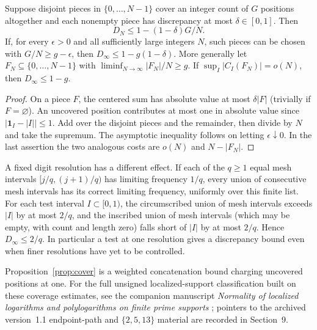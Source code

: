 \documentclass[11pt]{article}
\begin{document}
\begin{proposition}\label{prop:cover}
Suppose disjoint pieces in \(\{0,\ldots,N-1\}\) cover an integer count of \(G\) positions altogether and each nonempty piece has discrepancy at most \(\delta\in[0,1]\). Then
\begin{equation}\label{eq:covered}
 D_N\le 1-(1-\delta)G/N .
\end{equation}
If, for every \(\epsilon>0\) and all sufficiently large integers \(N\), such pieces can be chosen with \(G/N\ge g-\epsilon\), then \(D_\infty\le1-g(1-\delta)\). More generally let \(F_N\subseteq\{0,\ldots,N-1\}\) with \(\liminf_{N\to\infty} |F_N|/N\ge g\). If \(\sup_I|C_I(F_N)|=o(N)\), then \(D_\infty\le1-g\).
\end{proposition}
\begin{proof}
On a piece \(F\), the centered sum has absolute value at most \(\delta |F|\) (trivially if \(F=\varnothing\)). An uncovered position contributes at most one in absolute value since \(|\mathbf1_I-|I||\le1\). Add over the disjoint pieces and the remainder, then divide by \(N\) and take the supremum. The asymptotic inequality follows on letting \(\epsilon\downarrow0\). In the last assertion the two analogous costs are \(o(N)\) and \(N-|F_N|\).
\end{proof}
A fixed digit resolution has a different effect. If each of the \(q\ge1\) equal mesh intervals \([j/q,(j+1)/q)\) has limiting frequency \(1/q\), every union of consecutive mesh intervals has its correct limiting frequency, uniformly over this finite list. For each test interval \(I\subset[0,1)\), the circumscribed union of mesh intervals exceeds \(|I|\) by at most \(2/q\), and the inscribed union of mesh intervals (which may be empty, with count and length zero) falls short of \(|I|\) by at most \(2/q\). Hence \(D_\infty\le2/q\). In particular a test at one resolution gives a discrepancy bound even when finer resolutions have yet to be controlled.

Proposition~\ref{prop:cover} is a weighted concatenation bound charging uncovered positions at one. For the full unsigned localized-support classification built on these coverage estimates, see the companion manuscript \emph{Normality of localized logarithms and polylogarithms on finite prime supports} \cite{companionlocalized}; pointers to the archived version~1.1 endpoint-path and \(\{2,5,13\}\) material are recorded in Section~9.
\end{document}
